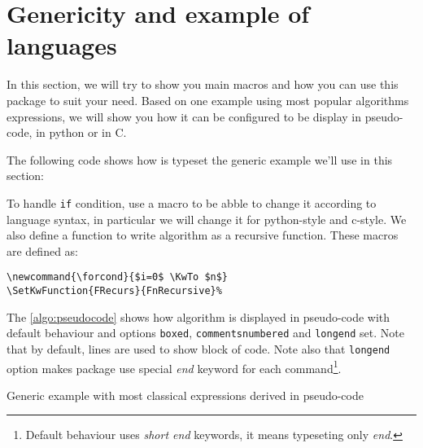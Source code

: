 \documentclass[a4paper]{article}
\begin{document}
\section{Genericity and example of languages}

In this section, we will try to show you main macros and how you can use this package to
suit your need. Based on one example using most popular algorithms expressions, we will
show you how it can be configured to be display in pseudo-code, in python or in C.

The following code shows how is typeset the generic example we'll use in this section:\par
{%
\noindent\fbox{%
  \begin{minipage}[c]{\textwidth}%
  \end{minipage}\label{code:exgeneric}%
}}%
\par\medskip
To handle \texttt{if} condition, use a macro to be abble to change it according to
language syntax, in particular we will change it for python-style and c-style. We also
define a function to write algorithm as a recursive function. These macros are defined as:\vspace{-1.5ex}
\begin{verbatim}
\newcommand{\forcond}{$i=0$ \KwTo $n$}
\SetKwFunction{FRecurs}{FnRecursive}%
\end{verbatim}

The \autoref{algo:pseudocode} shows how algorithm is displayed in pseudo-code with default
behaviour and options \texttt{boxed}, \texttt{commentsnumbered} and \texttt{longend}
set. Note that by default, lines are used to show block of code. Note also that
\texttt{longend} option makes package use special \emph{end} keyword for each
command\footnote{Default behaviour uses \emph{short end} keywords, it means typeseting only
  \emph{end}.}.
%
\newcommand{\forcond}{$i=0$ \KwTo $n$}
\begin{algorithm}\SetAlgoLongEnd
  \caption{Generic example with most classical expressions derived in pseudo-code}%
  \label{algo:pseudocode}
  
\end{algorithm}
\end{document}
